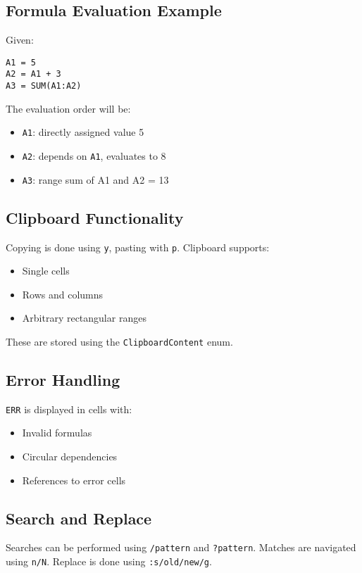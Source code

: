 \documentclass{article}
\begin{document}
\subsection{Formula Evaluation Example}

Given:
\begin{verbatim}
A1 = 5
A2 = A1 + 3
A3 = SUM(A1:A2)
\end{verbatim}

The evaluation order will be:
\begin{itemize}
  \item \texttt{A1}: directly assigned value 5
  \item \texttt{A2}: depends on \texttt{A1}, evaluates to 8
  \item \texttt{A3}: range sum of A1 and A2 = 13
\end{itemize}

\subsection{Clipboard Functionality}

Copying is done using \texttt{y}, pasting with \texttt{p}. Clipboard supports:
\begin{itemize}
  \item Single cells
  \item Rows and columns
  \item Arbitrary rectangular ranges
\end{itemize}

These are stored using the \texttt{ClipboardContent} enum.

\subsection{Error Handling}

\texttt{ERR} is displayed in cells with:
\begin{itemize}
  \item Invalid formulas
  \item Circular dependencies
  \item References to error cells
\end{itemize}

\subsection{Search and Replace}

Searches can be performed using \texttt{/pattern} and \texttt{?pattern}. Matches are navigated using \texttt{n/N}. Replace is done using \texttt{:s/old/new/g}.
\end{document}
